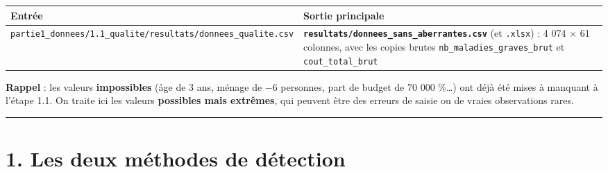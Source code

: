 \documentclass[

  french,

  10pt,

  a4paper,

]{article}
\newcounter{none} %
\begin{document}
{\def\LTcaptype{none} %

\begin{longtable}[]{@{}

  >{\raggedright\arraybackslash}p{}

  >{\raggedright\arraybackslash}p{}@{}}

\toprule\noalign{}

\begin{minipage}[b]{\linewidth}\raggedright

Entrée

\end{minipage} & \begin{minipage}[b]{\linewidth}\raggedright

Sortie principale

\end{minipage} \\

\midrule\noalign{}

\endhead

\bottomrule\noalign{}

\endlastfoot

\texttt{partie1\_donnees/1.1\_qualite/resultats/donnees\_qualite.csv} & \textbf{\texttt{resultats/donnees\_sans\_aberrantes.csv}} (et \texttt{.xlsx}) : 4 074 \ensuremath{\times} 61 colonnes, avec les copies brutes \texttt{nb\_maladies\_graves\_brut} et \texttt{cout\_total\_brut} \\

\end{longtable}

}



\textbf{Rappel} : les valeurs \textbf{impossibles} (âge de 3 ans, ménage de \ensuremath{-}6 personnes, part de budget de 70 000 \%\ldots) ont déjà été mises à manquant à l'étape 1.1. On traite ici les valeurs \textbf{possibles mais extrêmes}, qui peuvent être des erreurs de saisie ou de vraies observations rares.



\begin{center}\rule{0.5\linewidth}{0.5pt}\end{center}



\section{1. Les deux méthodes de détection}
\end{document}
